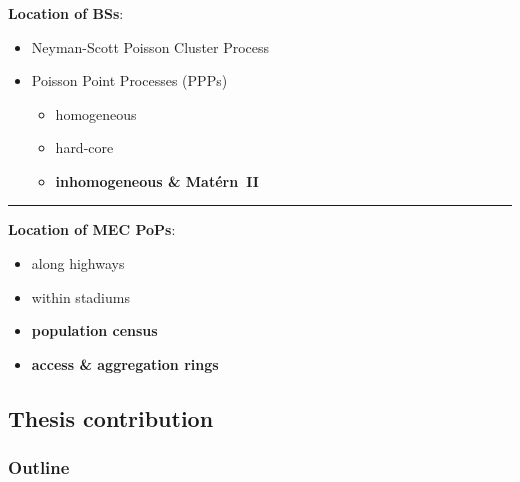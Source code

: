 \documentclass[aspectratio=169]{beamer}
\begin{document}
\begin{frame}
    \frametitle{\secname}
    \framesubtitle{\subsecname}
    \textbf{Location of BSs}:
    \begin{itemize}
        \item Neyman-Scott Poisson Cluster Process~\cite{vinay-moller-interference}
        \item Poisson Point Processes (PPPs)~\cite{stochastic-martina}
            \begin{itemize}
                \item homogeneous~\cite{cran-vinay-moller,hetnets-cor}
                \item hard-core~\cite{hard-core-cover} \pause
                \item {\color{red}\textbf{inhomogeneous \& Matérn~II}}
            \end{itemize}
    \end{itemize}
    \pause
    \vfill
    \hrule
    \vfill
    \textbf{Location of MEC PoPs}:
    \begin{itemize}
        \item along highways~\cite{usa-mec}
        \item within stadiums~\cite{tokio-olympics} \pause
        \item {\color{red}\textbf{population census}}
        \item {\color{red}\textbf{access \& aggregation rings}}
    \end{itemize}

\end{frame}


\subsection{Thesis contribution}
\begin{frame}
    \frametitle{Outline}
    \tableofcontents[subsectionstyle=show/shaded/hide,sectionstyle=show/shaded]
\end{frame}
\end{document}
